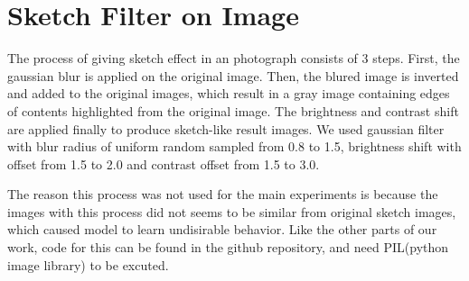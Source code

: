 \chapter{Sketch Filter on Image}\label{App:sketch_filter}

The process of giving sketch effect in an photograph consists of 3 steps. First, the gaussian blur is applied on the original image. Then, the blured image is inverted and added to the original images, which result in a gray image containing edges of contents highlighted from the original image. The brightness and contrast shift are applied finally to produce sketch-like result images. We used gaussian filter with blur radius of uniform random sampled from 0.8 to 1.5, brightness shift with offset from 1.5 to 2.0 and contrast offset from 1.5 to 3.0.

The reason this process was not used for the main experiments is because the images with this process did not seems to be similar from original sketch images, which caused model to learn undisirable behavior. Like the other parts of our work, code for this can be found in the github repository, and need PIL(python image library) to be excuted.



\endinput
